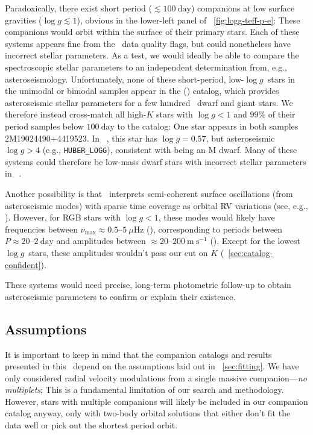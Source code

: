 \documentclass[modern, letterpaper]{aastex62}
\newcommand{\apogee}{\project{\acronym{APOGEE}}}
\newcommand{\thejoker}{\project{The~Joker}}
\newcommand{\DR}{\acronym{DR14}}
\newcommand{\logg}{\ensuremath{\log g}}
\begin{document}
Paradoxically, there exist short period ($\lesssim 100~\textrm{day}$) companions
at low surface gravities ($\logg \lesssim 1$), obvious in the lower-left panel
of \figurename~\ref{fig:logg-teff-p-e}: These companions would orbit within the
surface of their primary stars.
Each of these systems appears fine from the \apogee\ data quality flags, but
could nonetheless have incorrect stellar parameters.
As a test, we would ideally be able to compare the spectroscopic stellar
parameters to an independent determination from, e.g., asteroseismology.
Unfortunately, none of these short-period, low-\logg\ stars in the unimodal or
bimodal samples appear in the  (\citealt{Serenelli:2017})
catalog, which provides asteroseismic stellar parameters for a few hundred
\apogee\ dwarf and giant stars.
We therefore instead cross-match all high-$K$ stars with $\logg < 1$ and $99\%$
of their period samples below $100~\textrm{day}$ to the 
catalog: One star appears in both samples 2M19024490+4419523.
In \apogee\ \DR, this star has $\logg = 0.57$, but asteroseismic $\logg > 4$
(e.g., \texttt{HUBER\_LOGG}), consistent with being an M dwarf.
Many of these systems could therefore be low-mass dwarf stars with incorrect
stellar parameters in \apogee\ \DR.

Another possibility is that \thejoker\ interprets semi-coherent surface
oscillations (from asteroseismic modes) with sparse time coverage as orbital RV
variations (see, e.g., \citealt{Hekker:2008}).
However, for RGB stars with $\logg < 1$, these modes would likely have
frequencies between $\nu_{\textrm{max}} \approx 0.5$--$5~\mu\textrm{Hz}$
(\citealt{Garcia:2018}), corresponding to periods between $P \approx
20$--$2~\textrm{day}$ and amplitudes between $\approx
20$--$200~\textrm{m}~\textrm{s}^{-1}$ (\citealt{Huber:2011,Huber:2017}).
Except for the lowest \logg\ stars, these amplitudes wouldn't pass our cut on
$K$ (\sectionname~\ref{sec:catalog-confident}).

These systems would need precise, long-term photometric follow-up to obtain
asteroseismic parameters to confirm or explain their existence.


\subsection{Assumptions}
\label{sec:discuss-assumptions}

It is important to keep in mind that the companion catalogs and results
presented in this \documentname\ depend on the assumptions laid out in
\sectionname~\ref{sec:fitting}.
We have only considered radial velocity modulations from a single massive
companion---\emph{no multiplets}; This is a fundamental limitation of our search
and methodology.
However, stars with multiple companions will likely be included in our companion
catalog anyway, only with two-body orbital solutions that either don't fit the
data well or pick out the shortest period orbit.
\end{document}
